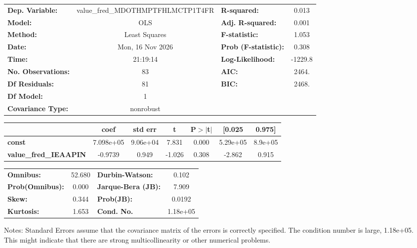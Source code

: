 \begin{center}
\begin{tabular}{lclc}
\toprule
\textbf{Dep. Variable:}       & value\_fred\_MDOTHMPTFHLMCTP1T4FR & \textbf{  R-squared:         } &     0.013   \\
\textbf{Model:}               &                OLS                & \textbf{  Adj. R-squared:    } &     0.001   \\
\textbf{Method:}              &           Least Squares           & \textbf{  F-statistic:       } &     1.053   \\
\textbf{Date:}                &          Mon, 16 Nov 2026         & \textbf{  Prob (F-statistic):} &    0.308    \\
\textbf{Time:}                &              21:19:14             & \textbf{  Log-Likelihood:    } &   -1229.8   \\
\textbf{No. Observations:}    &                   83              & \textbf{  AIC:               } &     2464.   \\
\textbf{Df Residuals:}        &                   81              & \textbf{  BIC:               } &     2468.   \\
\textbf{Df Model:}            &                    1              & \textbf{                     } &             \\
\textbf{Covariance Type:}     &             nonrobust             & \textbf{                     } &             \\
\bottomrule
\end{tabular}
\begin{tabular}{lcccccc}
                              & \textbf{coef} & \textbf{std err} & \textbf{t} & \textbf{P$> |$t$|$} & \textbf{[0.025} & \textbf{0.975]}  \\
\midrule
\textbf{const}                &    7.098e+05  &     9.06e+04     &     7.831  &         0.000        &     5.29e+05    &      8.9e+05     \\
\textbf{value\_fred\_IEAAPIN} &      -0.9739  &        0.949     &    -1.026  &         0.308        &       -2.862    &        0.915     \\
\bottomrule
\end{tabular}
\begin{tabular}{lclc}
\textbf{Omnibus:}       & 52.680 & \textbf{  Durbin-Watson:     } &    0.102  \\
\textbf{Prob(Omnibus):} &  0.000 & \textbf{  Jarque-Bera (JB):  } &    7.909  \\
\textbf{Skew:}          &  0.344 & \textbf{  Prob(JB):          } &   0.0192  \\
\textbf{Kurtosis:}      &  1.653 & \textbf{  Cond. No.          } & 1.18e+05  \\
\bottomrule
\end{tabular}
\end{center}

Notes: \newline
 [1] Standard Errors assume that the covariance matrix of the errors is correctly specified. \newline
 [2] The condition number is large, 1.18e+05. This might indicate that there are \newline
 strong multicollinearity or other numerical problems.